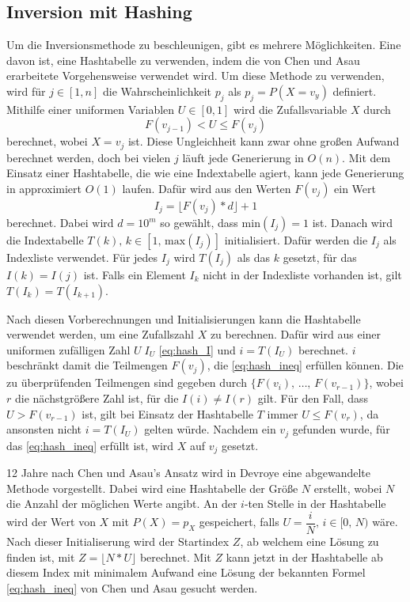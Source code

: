 \subsection{Inversion mit Hashing}
Um die Inversionsmethode zu beschleunigen, gibt es mehrere Möglichkeiten. Eine davon ist, 
eine Hashtabelle zu verwenden, indem die von Chen und Asau \cite{chen_asau-generating_random_variates-1974} erarbeitete 
Vorgehensweise verwendet wird. Um diese Methode zu verwenden, wird für $j \in [1, n]$ die Wahrscheinlichkeit $p_j$ als 
$p_j = P(X=v_y)$ definiert. Mithilfe einer uniformen Variablen $U \in [0, 1]$ wird die Zufallsvariable $X$ durch 
\begin{equation}
    F(v_{j-1}) < U \leq F(v_j)
    \label{eq:hash_ineq}
\end{equation}
berechnet, wobei $X = v_j$ ist. Diese Ungleichheit kann zwar ohne großen Aufwand berechnet werden, doch bei vielen $j$ 
läuft jede Generierung in $O(n)$. Mit dem Einsatz einer Hashtabelle, die wie eine Indextabelle agiert, kann jede 
Generierung in approximiert $O(1)$ laufen. Dafür wird aus den Werten $F(v_j)$ ein Wert
\begin{equation}
     I_j = \lfloor F(v_j) * d \rfloor + 1
     \label{eq:hash_I}
\end{equation}
berechnet. Dabei wird $d = 10^m$ so gewählt, dass $\mathrm{min}(I_j) = 1$ ist. Danach wird die Indextabelle $T(k),\, k \in [1,\, 
\mathrm{max}(I_j)]$ initialisiert. Dafür werden die $I_j$ als Indexliste verwendet. Für jedes $I_j$ wird $T(I_j)$ als das 
$k$ gesetzt, für das $I(k) = I(j)$ ist. Falls ein Element $I_k$ nicht in der Indexliste vorhanden ist, gilt $T(I_k) = T(I_{k+1})$. 

Nach diesen Vorberechnungen und Initialisierungen kann die Hashtabelle verwendet werden, um eine Zufallszahl $X$ zu berechnen. 
Dafür wird aus einer uniformen zufälligen Zahl $U\; I_U$ \eqref{eq:hash_I} und $i = T(I_U)$ berechnet. $i$ beschränkt 
damit die Teilmengen $F(v_j)$, die \eqref{eq:hash_ineq} erfüllen können. Die zu überprüfenden Teilmengen sind gegeben 
durch $\{F(v_i),\, \dots, \, F(v_{r-1})\}$, wobei $r$ die nächstgrößere Zahl ist, für die $I(i) \neq I(r)$ gilt. 
Für den Fall, dass $U > F(v_{r-1})$ ist, gilt bei Einsatz der Hashtabelle $T$ immer $U \leq F(v_r)$, da ansonsten nicht $i = T(I_U)$ 
gelten würde. Nachdem ein $v_j$ gefunden wurde, für das \eqref{eq:hash_ineq} erfüllt ist, wird $X$ auf $v_j$ gesetzt.

12 Jahre nach Chen und Asau's Ansatz wird in Devroye \cite{devroye-non_uniform_random_variate-1986} eine abgewandelte Methode 
vorgestellt. Dabei wird eine Hashtabelle der Größe $N$ erstellt, wobei $N$ die Anzahl der möglichen Werte angibt. An der $i$-ten 
Stelle in der Hashtabelle wird der Wert von $X$ mit $P(X) = p_X$ gespeichert, falls $U = \dfrac{i}{N},\, i \in [0,\, N)$ wäre. Nach 
dieser Initialiserung wird der Startindex $Z$, ab welchem eine Lösung zu finden ist, mit $Z = \lfloor N * U \rfloor$ berechnet. 
Mit $Z$ kann jetzt in der Hashtabelle ab diesem Index mit minimalem Aufwand eine Lösung der bekannten Formel \eqref{eq:hash_ineq} von Chen 
und Asau gesucht werden. 